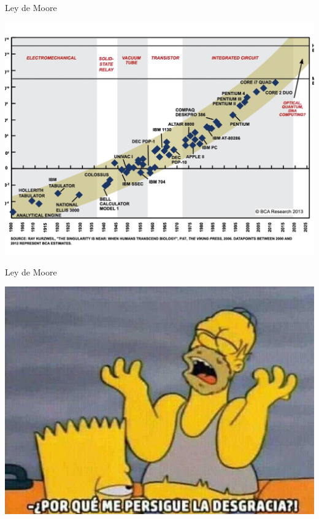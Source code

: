 \documentclass[10pt,xcolor={dvipsnames}]{beamer}
\begin{document}
\begin{frame}{Ley de Moore}
\begin{center}
\includegraphics[scale=0.25]{Figures/LeyMoore}
\end{center}
\end{frame}

\begin{frame}{Ley de Moore}
\begin{center}
\includegraphics[scale=0.3]{Figures/desgracia}
\end{center}
\end{frame}
\end{document}
